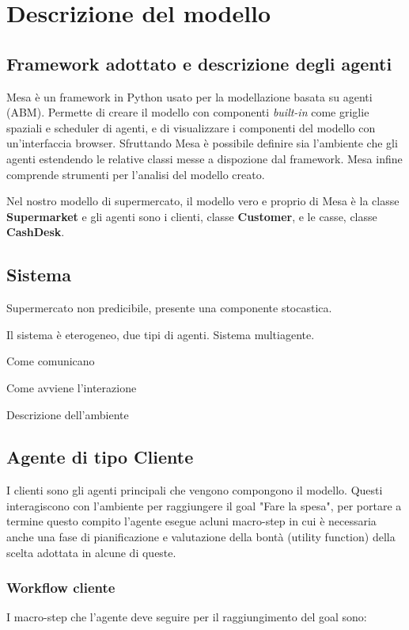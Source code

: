 \chapter{Descrizione del modello}

\section{Framework adottato e descrizione degli agenti}

 Mesa è un framework in Python usato per la modellazione basata su agenti (ABM). Permette di creare il modello con componenti \textit{built-in} come griglie spaziali e scheduler di agenti, e di visualizzare i componenti del modello con un'interfaccia browser. Sfruttando Mesa è possibile definire sia l'ambiente che gli agenti estendendo le relative classi messe a dispozione dal framework. Mesa infine comprende strumenti per l'analisi del modello creato.

Nel nostro modello di supermercato, il modello vero e proprio di Mesa è la classe \textbf{Supermarket} e gli agenti sono i clienti, classe \textbf{Customer}, e le casse, classe \textbf{CashDesk}. 

\section{Sistema}
Supermercato non predicibile, presente una componente stocastica.

Il sistema è eterogeneo, due tipi di agenti. Sistema multiagente.

Come comunicano

Come avviene l'interazione

Descrizione dell'ambiente

\section{Agente di tipo Cliente}
I clienti sono gli agenti principali che vengono compongono il modello. Questi interagiscono con l'ambiente per raggiungere il goal "Fare la spesa", per portare a termine questo compito l'agente esegue acluni macro-step in cui è necessaria anche una fase di pianificazione e valutazione della bontà (utility function) della scelta adottata in alcune di queste.

\subsection{Workflow cliente}
I macro-step che l'agente deve seguire per il raggiungimento del goal sono:

